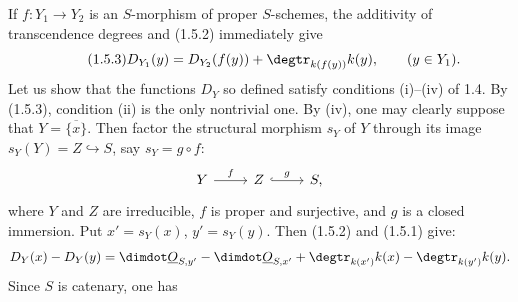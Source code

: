 If $f:Y_1\to Y_2$ is an $S$-morphism of proper $S$-schemes, the additivity of transcendence degrees and (1.5.2) immediately give
\begin{equation}\tag{1.5.3}
D_{Y_1}(y)=D_{Y_2}(f(y))+\degtr_{k(f(y))}k(y),\qquad(y\in Y_1).
\end{equation}
Let us show that the functions $D_Y$ so defined satisfy conditions (i)--(iv) of 1.4. By (1.5.3), condition (ii) is the only nontrivial one. By (iv), one may clearly suppose that $Y=\overline{\{x\}}$. Then factor the structural morphism $s_Y$ of $Y$ through its image $s_Y(Y)=Z\hookrightarrow S$, say $s_Y=g\circ f$:
\[
\begin{tikzcd}
Y \arrow[r,"f"] & Z \arrow[r,hook,"g"] & S,
\end{tikzcd}
\]
where $Y$ and $Z$ are irreducible, $f$ is proper and surjective, and $g$ is a closed immersion. Put $x'=s_Y(x)$, $y'=s_Y(y)$. Then (1.5.2) and (1.5.1) give:
\[
D_Y(x)-D_Y(y)=\dimdot\underline{O}_{S,y'}-\dimdot\underline{O}_{S,x'}+\degtr_{k(x')}k(x)-\degtr_{k(y')}k(y).
\]
Since $S$ is catenary, one has

